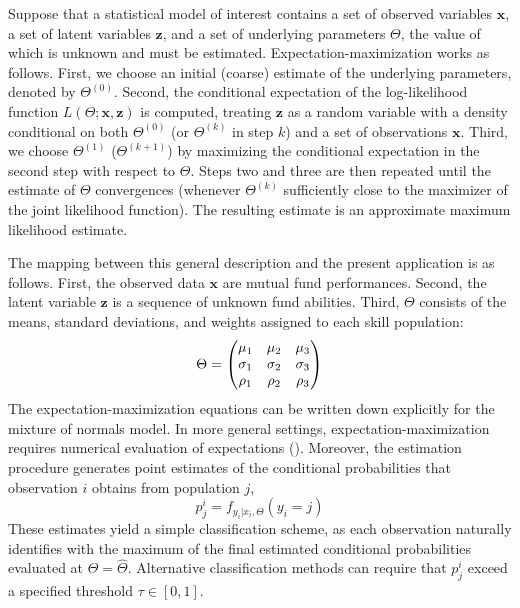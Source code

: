 		Suppose that a statistical model of interest contains a set of observed variables $\mathbf{x}$, a set of latent variables $\mathbf{z}$, and a set of underlying parameters $\Theta$, the value of which is unknown and must be estimated.  Expectation-maximization works as follows.  First, we choose an initial (coarse) estimate of the underlying parameters, denoted by $\Theta^{(0)}$.  Second, the conditional expectation of the log-likelihood function $L(\Theta; \mathbf{x}, \mathbf{z})$ is computed, treating $\mathbf{z}$ as a random variable with a density conditional on both $\Theta^{(0)}$ (or $\Theta^{(k)}$ in step $k$) and a set of observations $\mathbf{x}$.  Third, we choose $\Theta^{(1)}$ ($\Theta^{(k+1)}$) by maximizing the conditional expectation in the second step with respect to $\Theta$.  Steps two and three are then repeated until the estimate of $\Theta$ convergences (whenever $\Theta^{(k)}$ sufficiently close to the maximizer of the joint likelihood function).  The resulting estimate is an approximate maximum likelihood estimate.

		The mapping between this general description and the present application is as follows.  First, the observed data $\mathbf{x}$ are mutual fund performances.  Second, the latent variable $\mathbf{z}$ is a sequence of unknown fund abilities.  Third, $\Theta$ consists of the means, standard deviations, and weights assigned to each skill population:
		\vspace{4mm}
		\begin{equation} \label{eqn:mixture}
			\Theta = \begin{pmatrix} \mu_1 & \mu_2 & \mu_3 \\ \sigma_1 & \sigma_2 & \sigma_3 \\ \rho_1 & \rho_2 & \rho_3 \end{pmatrix}
			\vspace{3mm}
		\end{equation}
		The expectation-maximization equations can be written down explicitly for the mixture of normals model. In more general settings, expectation-maximization requires numerical evaluation of expectations (\citet{Casella2010}). Moreover, the estimation procedure generates point estimates of the conditional probabilities that observation $i$ obtains from population $j$,
		\begin{equation}
			\label{eq:posterior}
			p_j^i = f_{ y_i | x_i, \Theta}(y_i = j)
		\end{equation}
		These estimates yield a simple classification scheme, as each observation naturally identifies with the maximum of the final estimated conditional probabilities evaluated at $\Theta = \hat{\Theta}$.  Alternative classification methods can require that $p_j^i$ exceed a specified threshold $\tau \in [0, 1]$.


